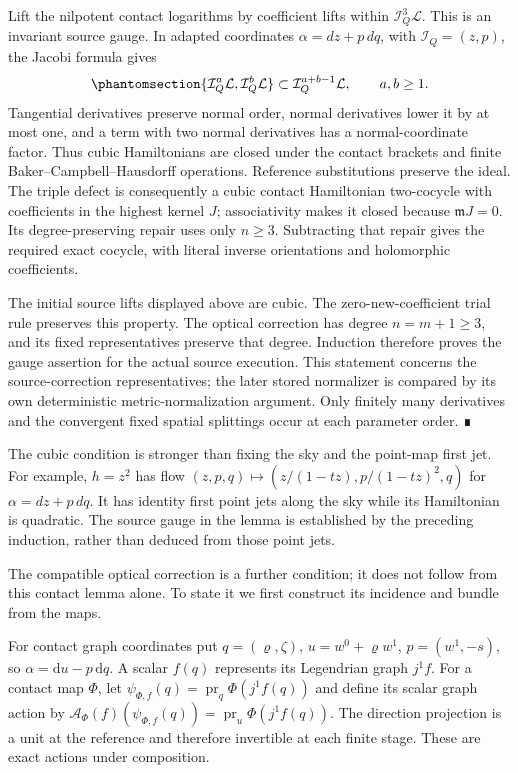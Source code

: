 \documentclass[
  english,
  11pt,
  reqno]{amsart}
\begin{document}
Lift the nilpotent contact logarithms by coefficient lifts within
\(\mathcal I_Q^3\mathcal L\). This is an invariant source gauge. In
adapted coordinates \(\alpha=dz+p\,dq\), with \(\mathcal I_Q=(z,p)\),
the Jacobi formula gives
\begin{equation}\protect\phantomsection\label{eq:gg-cubic-source-filtration}{
 \{\mathcal I_Q^a\mathcal L,\mathcal I_Q^b\mathcal L\}
       \subset\mathcal I_Q^{a+b-1}\mathcal L,
       \qquad a,b\ge1.
}\end{equation} Tangential derivatives preserve normal order, normal
derivatives lower it by at most one, and a term with two normal
derivatives has a normal-coordinate factor. Thus cubic Hamiltonians are
closed under the contact brackets and finite Baker--Campbell--Hausdorff
operations. Reference substitutions preserve the ideal. The triple
defect is consequently a cubic contact Hamiltonian two-cocycle with
coefficients in the highest kernel \(J\); associativity makes it closed
because \(\mathfrak mJ=0\). Its degree-preserving repair uses only
\(n\ge3\). Subtracting that repair gives the required exact cocycle,
with literal inverse orientations and holomorphic coefficients.

The initial source lifts displayed above are cubic. The
zero-new-coefficient trial rule preserves this property. The optical
correction has degree \(n=m+1\ge3\), and its fixed representatives
preserve that degree. Induction therefore proves the gauge assertion for
the actual source execution. This statement concerns the
source-correction representatives; the later stored normalizer is
compared by its own deterministic metric-normalization argument. Only
finitely many derivatives and the convergent fixed spatial splittings
occur at each parameter order. ∎

The cubic condition is stronger than fixing the sky and the point-map
first jet. For example, \(h=z^2\) has flow
\((z,p,q)\mapsto(z/(1-tz),p/(1-tz)^2,q)\) for \(\alpha=dz+p\,dq\). It
has identity first point jets along the sky while its Hamiltonian is
quadratic. The source gauge in the lemma is established by the preceding
induction, rather than deduced from those point jets.

The compatible optical correction is a further condition; it does not
follow from this contact lemma alone. To state it we first construct its
incidence and bundle from the maps.

For contact graph coordinates put \(q=(\varrho,\zeta)\),
\(u=w^0+\varrho w^1\), \(p=(w^1,-s)\), so
\(\alpha=\mathrm du-p\,\mathrm dq\). A scalar \(f(q)\) represents its
Legendrian graph \(j^1f\). For a contact map \(\Phi\), let
\(\psi_{\Phi,f}(q)=\operatorname{pr}_q\Phi(j^1f(q))\) and define its
scalar graph action by
\(\mathscr A_\Phi(f)(\psi_{\Phi,f}(q))=\operatorname{pr}_u\Phi(j^1f(q))\).
The direction projection is a unit at the reference and therefore
invertible at each finite stage. These are exact actions under
composition.
\end{document}
